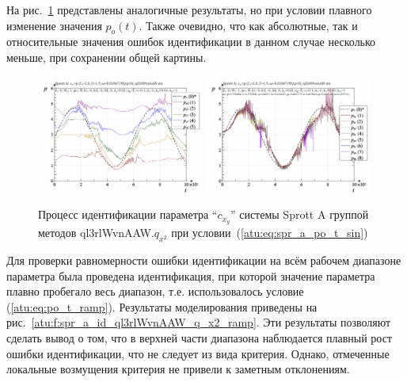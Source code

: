 На рис.~\ref{atu:f:spr_a_id_ql3rlWvnAAW_q_x2_sin} представлены аналогичные результаты,
но при условии плавного изменение значения $p_o(t)$. Также очевидно, что
как абсолютные, так и относительные значения ошибок идентификации в данном случае несколько
меньше, при сохранении общей картины.

\begin{figure}[htb!]
  \centerline{
    \includegraphics[width=0.49\textwidth]{p/cha/spr_a/ql3rlWvnAAW_x2/sprott_a_id-p_t_pi_ql3rlWvnAAW_sin.png}
    \hfill
    \includegraphics[width=0.49\textwidth]{p/cha/spr_a/ql3rlWvnAAW_x2/sprott_a_id-p_t_p_ql3rlWvnAAW_sin.png}
  }
  \caption{Процесс идентификации параметра ``$c_{x_y}$'' системы Sprott A группой методов ql3rlWvnAAW.$q_{x^2}$ при условии~(\ref{atu:eq:spr_a_po_t_sin})}
  \label{atu:f:spr_a_id_ql3rlWvnAAW_q_x2_sin}
\end{figure}

Для проверки равномерности ошибки идентификации на всём рабочем диапазоне параметра
была проведена идентификация, при которой значение параметра
плавно пробегало весь диапазон, т.е. использовалось условие (\ref{atu:eq:po_t_ramp}).
Результаты моделирования приведены на рис.~\ref{atu:f:spr_a_id_ql3rlWvnAAW_q_x2_ramp}.
Эти результаты позволяют сделать вывод о том, что в верхней части диапазона
наблюдается плавный рост ошибки идентификации, что не следует из
вида критерия. Однако, отмеченные локальные возмущения критерия
не привели к заметным отклонениям.


